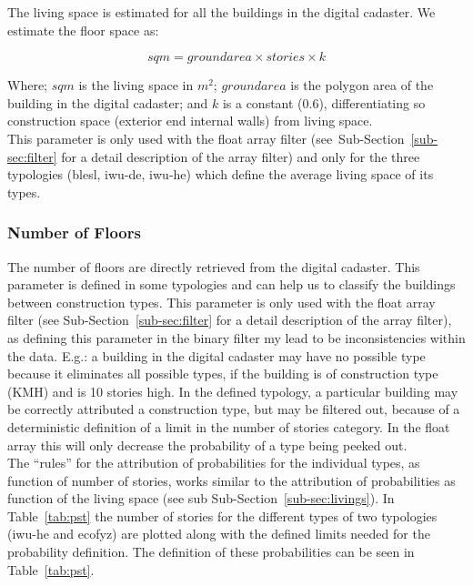 \documentclass[authoryear,preprint,review,12pt]{elsarticle}
\begin{document}
\begin{linenumbers}


The living space is estimated for all the buildings in the digital cadaster.
We estimate the floor space as:

\begin{equation} \label{eq:space}
sqm = groundarea \times stories \times k
\end{equation}

Where; $sqm$ is the living space in $m^2$; $groundarea$ is the polygon area of
the building in the digital cadaster; and $k$ is a constant (0.6),
differentiating so construction space (exterior end internal walls) from living
space.\\

This parameter is only used with the float array filter
(see~Sub-Section~\ref{sub-sec:filter} for a detail description of the array
filter) and only for the three typologies (blesl, iwu-de, iwu-he) which define
the average living space of its types.\\



\subsubsection{Number of Floors}

The number of floors are directly retrieved from the digital cadaster. This
parameter is defined in some typologies and can help us to classify the
buildings between construction types. This parameter is only used with the
float array filter (see Sub-Section~\ref{sub-sec:filter} for a detail
description of the array filter), as defining this parameter in the binary
filter my lead to be inconsistencies within the data.  E.g.: a building in the
digital cadaster may have no possible type because it eliminates all possible
types, if the building is of construction type (KMH) and is 10 stories high.
In the defined typology, a particular building may be correctly attributed a
construction type, but may be filtered out, because of a deterministic
definition of a limit in the number of stories category.  In the float array
this will only decrease the probability of a type being peeked out.\\

The ``rules'' for the attribution of probabilities for the individual types, as
function of number of stories, works similar to the attribution of
probabilities as function of the living space (see sub
Sub-Section~\ref{sub-sec:livings}). In Table~\ref{tab:pst} the number of
stories for the different types of two typologies (iwu-he and ecofyz) are
plotted along with the defined limits needed for the probability definition.
The definition of these probabilities can be seen in Table~\ref{tab:pst}.\\


\end{linenumbers}
\end{document}
